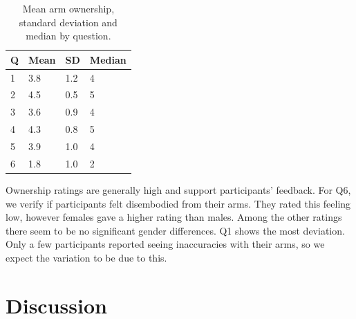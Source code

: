 \begin{table}[H]
\centering
\begin{tabular}{|llll|}
\hline
Q & Mean & SD & Median \\
\hline
1 & 3.8 & 1.2& 4 \\  
2 & 4.5 & 0.5& 5\\  
3 & 3.6 &  0.9& 4\\  
4 & 4.3 & 0.8& 5\\  
5 & 3.9 &  1.0&4 \\  
6 & 1.8 &  1.0& 2\\  
\hline
\end{tabular}
\caption{Mean arm ownership, standard deviation and median by question.}
\label{tbl:own}
\end{table} 

Ownership ratings are generally high and support participants' feedback. For Q6, we verify if participants felt disembodied from their arms. They rated this feeling low, however females gave a higher rating than males. Among the other ratings there seem to be no significant gender differences.
Q1 shows the most deviation. Only a few participants reported seeing inaccuracies with their arms, so we expect the variation to be due to this.\\

\section{Discussion}

